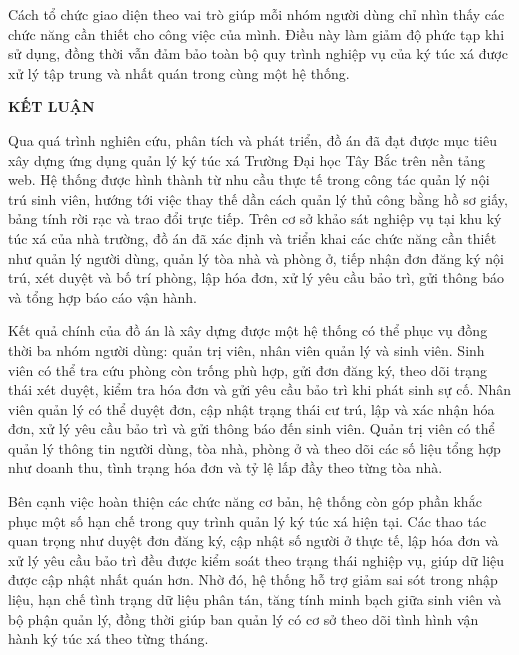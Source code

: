 \documentclass[13pt,a4paper]{extarticle}
\numberwithin{figure}{section}
\numberwithin{table}{section}
\begin{document}
	Cách tổ chức giao diện theo vai trò giúp mỗi nhóm người dùng chỉ nhìn thấy các chức năng cần thiết cho công việc của mình. Điều này làm giảm độ phức tạp khi sử dụng, đồng thời vẫn đảm bảo toàn bộ quy trình nghiệp vụ của ký túc xá được xử lý tập trung và nhất quán trong cùng một hệ thống.
	
	\newpage
	\begin{center}
		\fontsize{14pt}{20pt}\selectfont
		\textbf{KẾT LUẬN}
	\end{center}
	
	Qua quá trình nghiên cứu, phân tích và phát triển, đồ án đã đạt được mục tiêu xây dựng ứng dụng quản lý ký túc xá Trường Đại học Tây Bắc trên nền tảng web. Hệ thống được hình thành từ nhu cầu thực tế trong công tác quản lý nội trú sinh viên, hướng tới việc thay thế dần cách quản lý thủ công bằng hồ sơ giấy, bảng tính rời rạc và trao đổi trực tiếp. Trên cơ sở khảo sát nghiệp vụ tại khu ký túc xá của nhà trường, đồ án đã xác định và triển khai các chức năng cần thiết như quản lý người dùng, quản lý tòa nhà và phòng ở, tiếp nhận đơn đăng ký nội trú, xét duyệt và bố trí phòng, lập hóa đơn, xử lý yêu cầu bảo trì, gửi thông báo và tổng hợp báo cáo vận hành.
	
	Kết quả chính của đồ án là xây dựng được một hệ thống có thể phục vụ đồng thời ba nhóm người dùng: quản trị viên, nhân viên quản lý và sinh viên. Sinh viên có thể tra cứu phòng còn trống phù hợp, gửi đơn đăng ký, theo dõi trạng thái xét duyệt, kiểm tra hóa đơn và gửi yêu cầu bảo trì khi phát sinh sự cố. Nhân viên quản lý có thể duyệt đơn, cập nhật trạng thái cư trú, lập và xác nhận hóa đơn, xử lý yêu cầu bảo trì và gửi thông báo đến sinh viên. Quản trị viên có thể quản lý thông tin người dùng, tòa nhà, phòng ở và theo dõi các số liệu tổng hợp như doanh thu, tình trạng hóa đơn và tỷ lệ lấp đầy theo từng tòa nhà.
	
	Bên cạnh việc hoàn thiện các chức năng cơ bản, hệ thống còn góp phần khắc phục một số hạn chế trong quy trình quản lý ký túc xá hiện tại. Các thao tác quan trọng như duyệt đơn đăng ký, cập nhật số người ở thực tế, lập hóa đơn và xử lý yêu cầu bảo trì đều được kiểm soát theo trạng thái nghiệp vụ, giúp dữ liệu được cập nhật nhất quán hơn. Nhờ đó, hệ thống hỗ trợ giảm sai sót trong nhập liệu, hạn chế tình trạng dữ liệu phân tán, tăng tính minh bạch giữa sinh viên và bộ phận quản lý, đồng thời giúp ban quản lý có cơ sở theo dõi tình hình vận hành ký túc xá theo từng tháng.
	
\end{document}
